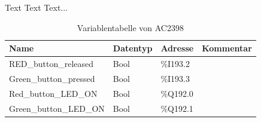 Text Text Text...
\begin{table}[h!]
	\centering
	\renewcommand{\arraystretch}{1.0} %
	\small
	\begin{tabular}{|l|l|l|l|}
		\hline
		\textbf{Name} & \textbf{Datentyp} & \textbf{Adresse} & \textbf{Kommentar}\\ \hline
		RED\_button\_released & Bool & \%I193.2 &  \\ \hline
		Green\_button\_pressed & Bool & \%I193.3 &  \\ \hline
		Red\_button\_LED\_ON & Bool & \%Q192.0 &  \\ \hline
		Green\_button\_LED\_ON & Bool & \%Q192.1 &  \\ \hline
	\end{tabular}
	\caption{Variablentabelle von AC2398}
	\label{tab:AC2398}
\end{table}
